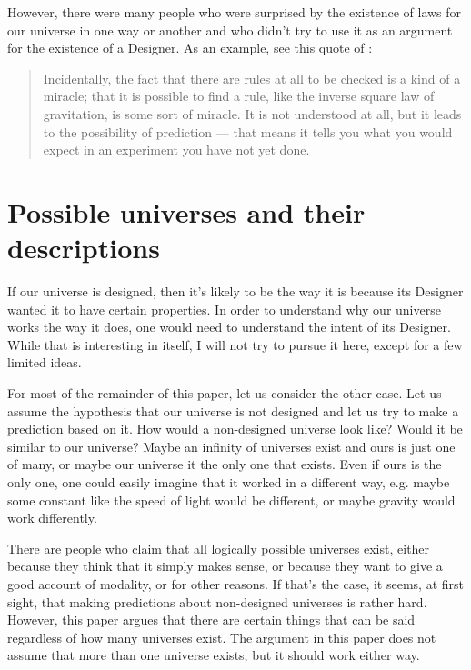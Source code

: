 \documentclass[a4paper
,draft
]{article}
\newcommand{\paper}[1]{paper}
\newcommand{\ghilimele}[1]{``#1"}
\begin{document}
However, there were many people who were surprised by the existence of laws
for our universe in one way or another and who didn't try to use it
as an argument for the existence of a Designer.
As an example, see this quote of \textcite{Feynman2009}:
\begin{quote}
Incidentally, the fact that there are rules at all to be checked
is a kind of a miracle; that it is possible to find a rule,
like the inverse square law of gravitation, is some sort of miracle.
It is not understood at all, but it leads to the possibility of
prediction --- that means it tells you what you would expect in
an experiment you have not yet done.
\end{quote}


\section{Possible universes and their descriptions}
\label{sec:possible-universes}

If our universe is designed, then it's likely to be the way it is because
its Designer wanted it to have certain properties.
In order to understand why our universe works the way it does,
one would need to understand the intent of its Designer.
While that is interesting in itself, I will not try to pursue it here,
except for a few limited ideas.

For most of the remainder of this \paper{}, let us consider the other case.
Let us assume the hypothesis that our universe is not designed
and let us try to make a prediction based on it.
How would a non-designed universe look like?
Would it be similar to our universe?
Maybe an infinity of universes exist and ours is just one of many,
or maybe our universe it the only one that exists.
Even if ours is the only one, one could easily imagine that it worked
in a different way, e.g. maybe some constant like the speed of light would be
different, or maybe gravity would work differently.

There are people who claim that all logically possible universes exist,
either because they think that it simply makes sense, or because they want to
give a good account of modality, or for other reasons.
If that's the case, it seems, at first sight, that making predictions about
non-designed universes is rather hard.
However, this paper argues that there are certain things that can be said
regardless of how many universes exist.
The argument in this \paper{} does not assume that more than
one universe exists, but it should work either way.
\end{document}
